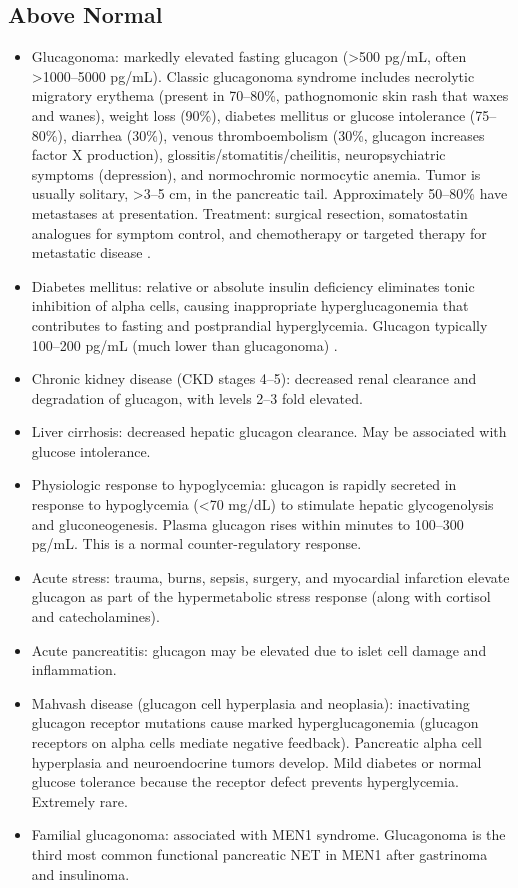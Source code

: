 \subsection*{Above Normal}
\begin{itemize}
  \item Glucagonoma: markedly elevated fasting glucagon (>500 pg/mL, often >1000--5000 pg/mL). Classic glucagonoma syndrome includes necrolytic migratory erythema (present in 70--80\%, pathognomonic skin rash that waxes and wanes), weight loss (90\%), diabetes mellitus or glucose intolerance (75--80\%), diarrhea (30\%), venous thromboembolism (30\%, glucagon increases factor X production), glossitis/stomatitis/cheilitis, neuropsychiatric symptoms (depression), and normochromic normocytic anemia. Tumor is usually solitary, >3--5 cm, in the pancreatic tail. Approximately 50--80\% have metastases at presentation. Treatment: surgical resection, somatostatin analogues for symptom control, and chemotherapy or targeted therapy for metastatic disease \cite{vanbeek2004glucagonoma}.
  \item Diabetes mellitus: relative or absolute insulin deficiency eliminates tonic inhibition of alpha cells, causing inappropriate hyperglucagonemia that contributes to fasting and postprandial hyperglycemia. Glucagon typically 100--200 pg/mL (much lower than glucagonoma) \cite{dunning2007alpha}.
  \item Chronic kidney disease (CKD stages 4--5): decreased renal clearance and degradation of glucagon, with levels 2--3 fold elevated.
  \item Liver cirrhosis: decreased hepatic glucagon clearance. May be associated with glucose intolerance.
  \item Physiologic response to hypoglycemia: glucagon is rapidly secreted in response to hypoglycemia (<70 mg/dL) to stimulate hepatic glycogenolysis and gluconeogenesis. Plasma glucagon rises within minutes to 100--300 pg/mL. This is a normal counter-regulatory response.
  \item Acute stress: trauma, burns, sepsis, surgery, and myocardial infarction elevate glucagon as part of the hypermetabolic stress response (along with cortisol and catecholamines).
  \item Acute pancreatitis: glucagon may be elevated due to islet cell damage and inflammation.
  \item Mahvash disease (glucagon cell hyperplasia and neoplasia): inactivating glucagon receptor mutations cause marked hyperglucagonemia (glucagon receptors on alpha cells mediate negative feedback). Pancreatic alpha cell hyperplasia and neuroendocrine tumors develop. Mild diabetes or normal glucose tolerance because the receptor defect prevents hyperglycemia. Extremely rare.
  \item Familial glucagonoma: associated with MEN1 syndrome. Glucagonoma is the third most common functional pancreatic NET in MEN1 after gastrinoma and insulinoma.
\end{itemize}

